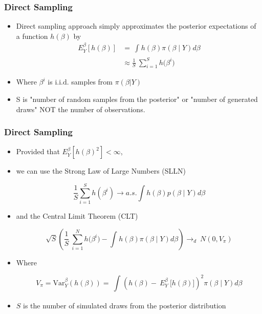 \documentclass[
  shownotes,
  xcolor={svgnames},
  hyperref={colorlinks,citecolor=DarkBlue,linkcolor=DarkRed,urlcolor=DarkBlue}
  , aspectratio=169]{beamer}
\begin{document}
\begin{frame}[fragile]
\frametitle{Direct Sampling}

\begin{itemize}
\item Direct sampling approach simply approximates the posterior expectations of a function $h(\beta)$ by
\medskip
\begin{align}
E_{Y}^{\beta}\left\lbrack h\left( \beta \right) \right\rbrack &= \ \int_{}^{}{h\left( \beta \right)\pi\left( \beta \middle| Y \right)d\beta} \\ \nonumber
&\approx \frac{1}{S}\ \sum_{i = 1}^{S}{h(\beta^{i}})
\end{align}
\medskip
\item Where $\beta^{i}$ is $\text{i.i.d.}$ samples from $\pi(\beta|Y)$
\medskip
\item S is "number of random samples from the posterior" or "number of generated draws" NOT the number of observations.
\end{itemize}
\end{frame}
\begin{frame}[fragile]
\frametitle{Direct Sampling}

\begin{itemize}
\item Provided that $E_{Y}^{\beta}\left\lbrack h\left( \beta \right)^{2} \right\rbrack <  \infty$, 
\medskip

\item we can use the Strong Law of Large Numbers (SLLN) 

$$\frac{1}{S} \sum_{i = 1}^{S} h(\beta^{i}) \rightarrow a.s. \int h\left( \beta \right)p\left( \beta \middle| Y \right) d\beta$$

\item and the Central Limit Theorem (CLT) 

$$\sqrt{S} \left( \frac{1}{S}\ \sum_{i = 1}^{N}{h(\beta^{i}}) -  \int_{}^{}{h\left( \beta \right) \pi \left( \beta \middle| Y \right) d\beta} \right) \rightarrow_{d}\ N(0,V_{\pi})$$


\item Where

$$V_{\pi} = \text{Var}_{Y}^{\beta}\left( h\left( \beta \right) \right) = \ \int_{}^{}{\left( h\left( \beta \right) - \ E_{Y}^{\beta}\ \lbrack h\left( \beta \right)\rbrack \right)^{2}\pi\left( \beta \middle| Y \right) d\beta}$$

\item $S$ is the number of simulated draws from the posterior distribution
\end{itemize}
\end{frame}
\end{document}

